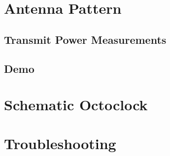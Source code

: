 \chapter{Antenna Pattern}
\label{ch:AntennaPat}

\section{Transmit Power Measurements}\label{GainDistortion}

\section{Demo}


\chapter{Schematic Octoclock}
\label{ch:HWSchOctoClock}


\chapter{Troubleshooting}
\label{ch:troubleshooting}
